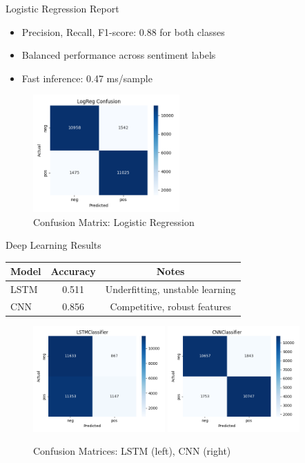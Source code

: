 \documentclass{beamer}
\begin{document}
\begin{frame}{Logistic Regression Report}
\begin{itemize}
  \item Precision, Recall, F1-score: 0.88 for both classes
  \item Balanced performance across sentiment labels
  \item Fast inference: 0.47 ms/sample
\end{itemize}
\begin{figure}[H]
\centering
\includegraphics[width=0.5\textwidth]{figures/LogReg_confusion.png}
\caption*{Confusion Matrix: Logistic Regression}
\end{figure}
\end{frame}

\begin{frame}{Deep Learning Results}
\begin{table}[H]
\centering
\begin{tabular}{lcc}
\toprule
\textbf{Model} & \textbf{Accuracy} & \textbf{Notes} \\
\midrule
LSTM & 0.511 & Underfitting, unstable learning \\
CNN & 0.856 & Competitive, robust features \\
\bottomrule
\end{tabular}
\end{table}
\begin{figure}[H]
\includegraphics[width=0.45\textwidth]{figures/LSTMClassifier_confusion.png}
\includegraphics[width=0.45\textwidth]{figures/CNNClassifier_confusion.png}
\caption*{Confusion Matrices: LSTM (left), CNN (right)}
\end{figure}
\end{frame}
\end{document}
